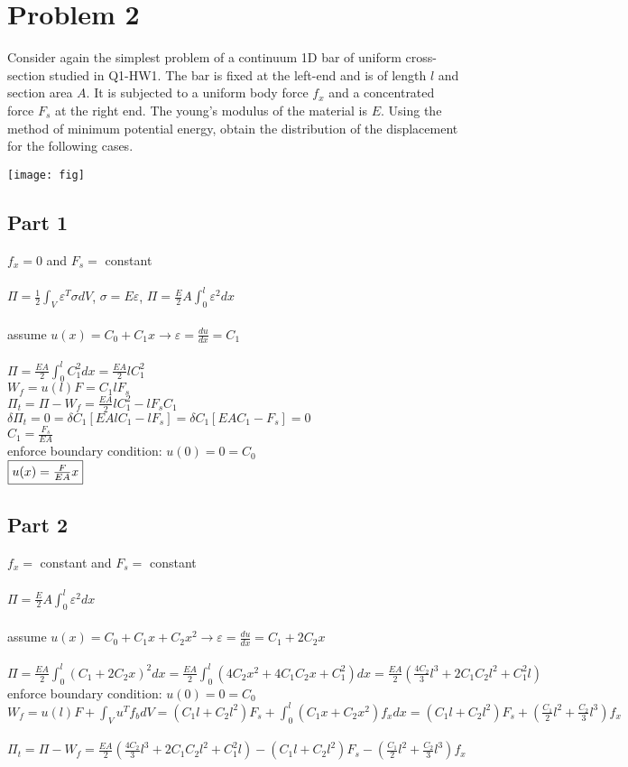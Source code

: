 \documentclass{article}
\begin{document}
\section*{Problem 2}
Consider again the simplest problem of a continuum 1D bar of uniform cross-section studied in Q1-HW1.
The bar is fixed at the left-end and is of length $l$ and section area $A$. It is subjected to a uniform body
force $f_x$ and a concentrated force $F_s$ at the right end. The young’s modulus of the material is $E$. Using
the method of minimum potential energy, obtain the distribution of the displacement for the following cases.
\begin{center}
    \texttt{[image: fig]}
\end{center}

\subsection*{Part 1}
$f_x=0$ and $F_s=$ constant \\\\
$\Pi=\frac{1}{2}\int_V \varepsilon^T\sigma dV$, $\sigma=E\varepsilon$,
$\Pi=\frac{E}{2}A\int_{0}^{l}\varepsilon^2 dx$ \\\\
assume $u(x)=C_0+C_1x \rightarrow \varepsilon=\frac{du}{dx}=C_1$ \\\\
$\Pi=\frac{EA}{2}\int_{0}^{l}C_1^2 dx=\frac{EA}{2}lC_1^2$ \\
$W_f=u(l)F=C_1lF_s$ \\
$\Pi_t=\Pi-W_f=\frac{EA}{2}lC_1^2-lF_sC_1$ \\
$\delta\Pi_t=0=\delta C_1[EAlC_1-lF_s]=\delta C_1[EAC_1-F_s]=0$ \\
$C_1=\frac{F_s}{EA}$ \\
enforce boundary condition: $u(0)=0=C_0$ \\
$\fbox{$u(x)=\frac{F}{EA}x$}$

\subsection*{Part 2}
$f_x=$ constant and $F_s=$ constant \\\\
$\Pi=\frac{E}{2}A\int_{0}^{l}\varepsilon^2 dx$ \\\\
assume $u(x)=C_0+C_1x+C_2x^2 \rightarrow \varepsilon=\frac{du}{dx}=C_1+2C_2x$ \\\\
$\Pi=\frac{EA}{2}\int_{0}^{l}(C_1+2C_2x)^2 dx=\frac{EA}{2}\int_{0}^{l}(4C_2x^2+4C_1C_2x+C_1^2)dx
=\frac{EA}{2}(\frac{4C_2}{3}l^3+2C_1C_2l^2+C_1^2l)$\\
enforce boundary condition: $u(0)=0=C_0$ \\
$W_f=u(l)F+\int_{V}u^Tf_bdV=(C_1l+C_2l^2)F_s+\int_{0}^{l}(C_1x+C_2x^2)f_xdx=(C_1l+C_2l^2)F_s+
(\frac{C_1}{2}l^2+\frac{C_2}{3}l^3)f_x$ \\\\
$\Pi_t=\Pi-W_f=\frac{EA}{2}(\frac{4C_2}{3}l^3+2C_1C_2l^2+C_1^2l)-(C_1l+C_2l^2)F_s-
(\frac{C_1}{2}l^2+\frac{C_2}{3}l^3)f_x$
\end{document}
